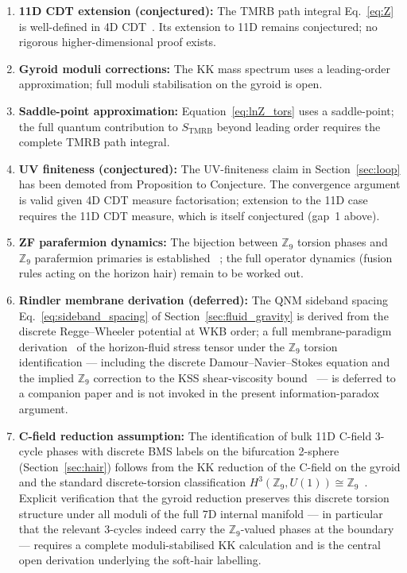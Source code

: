 \documentclass[11pt,a4paper]{article}
\begin{document}
\begin{enumerate}[leftmargin=*, label=\arabic*.]
  \item \textbf{11D CDT extension (conjectured):} The TMRB path
    integral Eq.~\eqref{eq:Z} is well-defined in 4D CDT~\cite{AJL2004,AJL2005}.
    Its extension to 11D remains conjectured; no rigorous higher-dimensional
    proof exists.
  \item \textbf{Gyroid moduli corrections:} The KK mass spectrum uses a
    leading-order approximation; full moduli stabilisation on the gyroid is open.
  \item \textbf{Saddle-point approximation:} Equation~\eqref{eq:lnZ_tors}
    uses a saddle-point; the full quantum contribution to $S_{\mathrm{TMRB}}$
    beyond leading order requires the complete TMRB path integral.
  \item \textbf{UV finiteness (conjectured):} The UV-finiteness claim in
    Section~\ref{sec:loop} has been demoted from Proposition to Conjecture.
    The convergence argument is valid given 4D CDT measure factorisation;
    extension to the 11D case requires the 11D CDT measure, which is itself
    conjectured (gap~1 above).
  \item \textbf{ZF parafermion dynamics:} The bijection between $\mathbb{Z}_9$
    torsion phases and $\mathbb{Z}_9$ parafermion primaries is established
    ~\cite{BresslerCH2026}; the full operator dynamics (fusion rules acting on
    the horizon hair) remain to be worked out.
  \item \textbf{Rindler membrane derivation (deferred):} The QNM sideband
    spacing Eq.~\eqref{eq:sideband_spacing} of Section~\ref{sec:fluid_gravity} is
    derived from the discrete Regge--Wheeler potential at WKB order; a full
    membrane-paradigm derivation~\cite{Damour1978} of the horizon-fluid stress
    tensor under the $\mathbb{Z}_9$ torsion identification --- including the
    discrete Damour--Navier--Stokes equation and the implied $\mathbb{Z}_9$
    correction to the KSS shear-viscosity bound~\cite{KSS2005} --- is
    deferred to a companion paper and is not invoked in the present
    information-paradox argument.
  \item \textbf{C-field reduction assumption:} The identification of bulk
    11D C-field 3-cycle phases with discrete BMS labels on the bifurcation
    2-sphere (Section~\ref{sec:hair}) follows from the KK reduction of
    the C-field on the gyroid and the standard discrete-torsion classification
    $H^3(\mathbb{Z}_9, U(1)) \cong \mathbb{Z}_9$~\cite{Vafa1986,AspinwallMorrison1995}.
    Explicit verification that the gyroid reduction preserves this discrete
    torsion structure under all moduli of the full 7D internal manifold ---
    in particular that the relevant 3-cycles indeed carry the
    $\mathbb{Z}_9$-valued phases at the boundary --- requires a complete
    moduli-stabilised KK calculation and is the central open derivation
    underlying the soft-hair labelling.


\end{enumerate}
\end{document}
